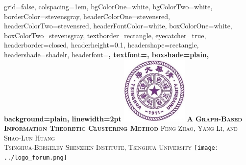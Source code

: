 \documentclass[portrait,final,archE,fontscale=0.3]{baposter}
\begin{document}


\begin{poster}%
  {
  grid=false,
  colspacing=1em,
  bgColorOne=white,
  bgColorTwo=white,
  borderColor=stevensgray,
  headerColorOne=stevensred,
  headerColorTwo=stevensred,
  headerFontColor=white,
  boxColorOne=white,
  boxColorTwo=stevensgray,
  textborder=rectangle,
  eyecatcher=true,
  headerborder=closed,
  headerheight=0.1\textheight,
  headershape=rectangle,
  headershade=shadelr,
  headerfont=\Large\bf\textsc, %
  textfont={\setlength{\parindent}{1.5em}},
  boxshade=plain,
  background=plain,
  linewidth=2pt
  }
  {
  		\includegraphics[height=9.0em]{thu.jpg}
  } %
  {\bf \textsc{ A Graph-Based Information Theoretic Clustering Method} }
  {\textsc{  Feng Zhao, Yang Li, and Shao-Lun Huang \\ Tsinghua-Berkeley Shenzhen Institute, Tsinghua University}}
  {%
    \texttt{[image: ../logo\_forum.png]}
  }


\end{poster}
\end{document}
